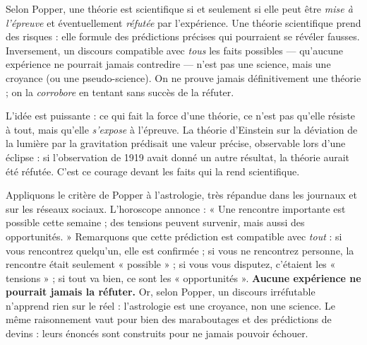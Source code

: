 \documentclass[11pt]{article}
\begin{document}
\begin{propriete}
Selon Popper, une théorie est scientifique si et seulement si elle peut être \emph{mise à l'épreuve} et éventuellement \emph{réfutée} par l'expérience. Une théorie scientifique prend des risques : elle formule des prédictions précises qui pourraient se révéler fausses. Inversement, un discours compatible avec \emph{tous} les faits possibles --- qu'aucune expérience ne pourrait jamais contredire --- n'est pas une science, mais une croyance (ou une pseudo-science). On ne prouve jamais définitivement une théorie ; on la \emph{corrobore} en tentant sans succès de la réfuter.
\end{propriete}

L'idée est puissante : ce qui fait la force d'une théorie, ce n'est pas qu'elle résiste à tout, mais qu'elle \emph{s'expose} à l'épreuve. La théorie d'Einstein sur la déviation de la lumière par la gravitation prédisait une valeur précise, observable lors d'une éclipse : si l'observation de 1919 avait donné un autre résultat, la théorie aurait été réfutée. C'est ce courage devant les faits qui la rend scientifique.

\begin{exemplebox}
Appliquons le critère de Popper à l'astrologie, très répandue dans les journaux et sur les réseaux sociaux. L'horoscope annonce : « Une rencontre importante est possible cette semaine ; des tensions peuvent survenir, mais aussi des opportunités. » Remarquons que cette prédiction est compatible avec \emph{tout} : si vous rencontrez quelqu'un, elle est confirmée ; si vous ne rencontrez personne, la rencontre était seulement « possible » ; si vous vous disputez, c'étaient les « tensions » ; si tout va bien, ce sont les « opportunités ». \textbf{Aucune expérience ne pourrait jamais la réfuter.} Or, selon Popper, un discours irréfutable n'apprend rien sur le réel : l'astrologie est une croyance, non une science. Le même raisonnement vaut pour bien des maraboutages et des prédictions de devins : leurs énoncés sont construits pour ne jamais pouvoir échouer.
\end{exemplebox}
\end{document}
